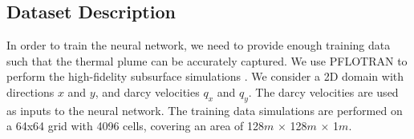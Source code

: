 \documentclass{article} %
\begin{document}
\subsection*{Dataset Description}

In order to train the neural network, we need to provide enough training data such that the thermal plume can be accurately captured. We use PFLOTRAN to perform the high-fidelity subsurface simulations \cite{pflotran-paper}. We consider a 2D domain with directions $x$ and $y$, and darcy velocities $q_x$ and $q_y$. The darcy velocities are used as inputs to the neural network. The training data simulations are performed on a 64x64 grid with 4096 cells, covering an area of 128$m$ $\times$ 128$m$ $\times$ 1$m$. 







\end{document}
